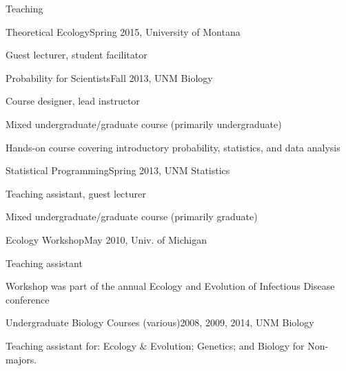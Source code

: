 \documentclass{resume} %
\begin{document}
\begin{rSection}{Teaching}
\begin{rSubsection}{Theoretical Ecology}{Spring 2015, University of Montana}{}{}
\item Guest lecturer, student facilitator
\end{rSubsection}
\begin{rSubsection}{Probability for Scientists}{Fall 2013, UNM Biology}{}{}
\item Course designer, lead instructor
\item Mixed undergraduate/graduate course (primarily undergraduate)
\item Hands-on course covering introductory probability, statistics, and data analysis
\end{rSubsection}
\begin{rSubsection}{Statistical Programming}{Spring 2013, UNM Statistics}{}{}
\item Teaching assistant, guest lecturer
\item Mixed undergraduate/graduate course (primarily graduate)
\end{rSubsection}
\begin{rSubsection}{Ecology Workshop}{May 2010, Univ. of Michigan}{}{}
\item Teaching assistant
\item Workshop was part of the annual Ecology and Evolution of Infectious
Disease conference
\end{rSubsection}
\begin{rSubsection}{Undergraduate Biology Courses (various)}{2008, 2009, 2014, UNM Biology}{}{}
\item Teaching assistant for: Ecology \& Evolution; Genetics; and Biology for
Non-majors.
\end{rSubsection}
\end{rSection}
\end{document}
